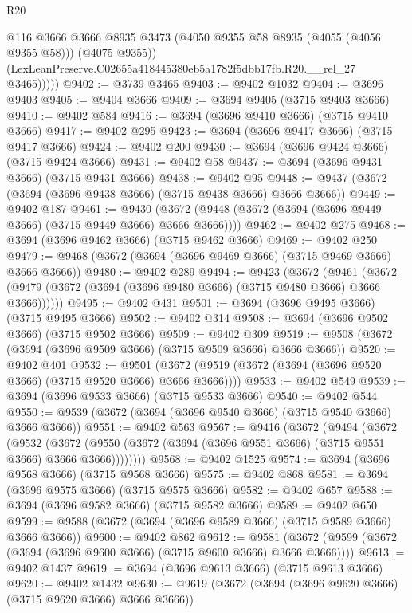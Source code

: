 \begin{lexlean}{R20}
\begin{coremodule}
              @116
              @3666
              @3666
              @8935
              @3473
              (@4050 @9355 @58 @8935 (@4055 (@4056 @9355 @58)))
              (@4075 @9355))
            (LexLeanPreserve.C02655a418445380eb5a1782f5dbb17fb.R20.__rel_27 @3465)))))
@9402 := @3739 @3465
@9403 := @9402 @1032
@9404 := @3696 @9403
@9405 := @9404 @3666
@9409 := @3694 @9405 (@3715 @9403 @3666)
@9410 := @9402 @584
@9416 := @3694 (@3696 @9410 @3666) (@3715 @9410 @3666)
@9417 := @9402 @295
@9423 := @3694 (@3696 @9417 @3666) (@3715 @9417 @3666)
@9424 := @9402 @200
@9430 := @3694 (@3696 @9424 @3666) (@3715 @9424 @3666)
@9431 := @9402 @58
@9437 := @3694 (@3696 @9431 @3666) (@3715 @9431 @3666)
@9438 := @9402 @95
@9448 := @9437 (@3672 (@3694 (@3696 @9438 @3666) (@3715 @9438 @3666) @3666 @3666))
@9449 := @9402 @187
@9461 := @9430 (@3672 (@9448 (@3672 (@3694 (@3696 @9449 @3666) (@3715 @9449 @3666) @3666 @3666))))
@9462 := @9402 @275
@9468 := @3694 (@3696 @9462 @3666) (@3715 @9462 @3666)
@9469 := @9402 @250
@9479 := @9468 (@3672 (@3694 (@3696 @9469 @3666) (@3715 @9469 @3666) @3666 @3666))
@9480 := @9402 @289
@9494 := @9423
    (@3672
      (@9461 (@3672 (@9479 (@3672 (@3694 (@3696 @9480 @3666) (@3715 @9480 @3666) @3666 @3666))))))
@9495 := @9402 @431
@9501 := @3694 (@3696 @9495 @3666) (@3715 @9495 @3666)
@9502 := @9402 @314
@9508 := @3694 (@3696 @9502 @3666) (@3715 @9502 @3666)
@9509 := @9402 @309
@9519 := @9508 (@3672 (@3694 (@3696 @9509 @3666) (@3715 @9509 @3666) @3666 @3666))
@9520 := @9402 @401
@9532 := @9501 (@3672 (@9519 (@3672 (@3694 (@3696 @9520 @3666) (@3715 @9520 @3666) @3666 @3666))))
@9533 := @9402 @549
@9539 := @3694 (@3696 @9533 @3666) (@3715 @9533 @3666)
@9540 := @9402 @544
@9550 := @9539 (@3672 (@3694 (@3696 @9540 @3666) (@3715 @9540 @3666) @3666 @3666))
@9551 := @9402 @563
@9567 := @9416
    (@3672
      (@9494
        (@3672
          (@9532
            (@3672 (@9550 (@3672 (@3694 (@3696 @9551 @3666) (@3715 @9551 @3666) @3666 @3666))))))))
@9568 := @9402 @1525
@9574 := @3694 (@3696 @9568 @3666) (@3715 @9568 @3666)
@9575 := @9402 @868
@9581 := @3694 (@3696 @9575 @3666) (@3715 @9575 @3666)
@9582 := @9402 @657
@9588 := @3694 (@3696 @9582 @3666) (@3715 @9582 @3666)
@9589 := @9402 @650
@9599 := @9588 (@3672 (@3694 (@3696 @9589 @3666) (@3715 @9589 @3666) @3666 @3666))
@9600 := @9402 @862
@9612 := @9581 (@3672 (@9599 (@3672 (@3694 (@3696 @9600 @3666) (@3715 @9600 @3666) @3666 @3666))))
@9613 := @9402 @1437
@9619 := @3694 (@3696 @9613 @3666) (@3715 @9613 @3666)
@9620 := @9402 @1432
@9630 := @9619 (@3672 (@3694 (@3696 @9620 @3666) (@3715 @9620 @3666) @3666 @3666))

\end{coremodule}
\end{lexlean}
